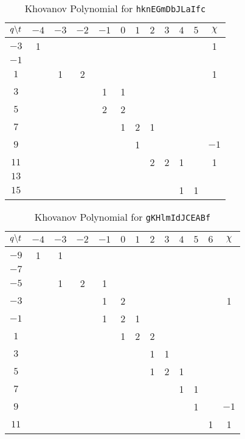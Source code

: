 \begin{table}
    \centering
    \begin{tabular}{| c | c | c | c | c | c | c | c | c | c | c | c |}
        \hline
        $q\symbol{92}t$&$-4$&$-3$&$-2$&$-1$&$0$&$1$&$2$&$3$&$4$&$5$&$\chi$\\
        \hline
        $-3$&1&&&&&&&&&&1\\
        \hline
        $-1$&&&&&&&&&&&\\
        \hline
        $1$&&1&2&&&&&&&&1\\
        \hline
        $3$&&&&1&1&&&&&&\\
        \hline
        $5$&&&&2&2&&&&&&\\
        \hline
        $7$&&&&&1&2&1&&&&\\
        \hline
        $9$&&&&&&1&&&&&$-1$\\
        \hline
        $11$&&&&&&&2&2&1&&1\\
        \hline
        $13$&&&&&&&&&&&\\
        \hline
        $15$&&&&&&&&&1&1&\\
        \hline
    \end{tabular}
    \caption{Khovanov Polynomial for \texttt{hknEGmDbJLaIfc}}
\end{table}
\begin{table}
    \centering
    \begin{tabular}{| c | c | c | c | c | c | c | c | c | c | c | c | c |}
        \hline
        $q\symbol{92}t$&$-4$&$-3$&$-2$&$-1$&$0$&$1$&$2$&$3$&$4$&$5$&$6$&$\chi$\\
        \hline
        $-9$&1&1&&&&&&&&&&\\
        \hline
        $-7$&&&&&&&&&&&&\\
        \hline
        $-5$&&1&2&1&&&&&&&&\\
        \hline
        $-3$&&&&1&2&&&&&&&1\\
        \hline
        $-1$&&&&1&2&1&&&&&&\\
        \hline
        $1$&&&&&1&2&2&&&&&\\
        \hline
        $3$&&&&&&&1&1&&&&\\
        \hline
        $5$&&&&&&&1&2&1&&&\\
        \hline
        $7$&&&&&&&&&1&1&&\\
        \hline
        $9$&&&&&&&&&&1&&$-1$\\
        \hline
        $11$&&&&&&&&&&&1&1\\
        \hline
    \end{tabular}
    \caption{Khovanov Polynomial for \texttt{gKHlmIdJCEABf}}
\end{table}
